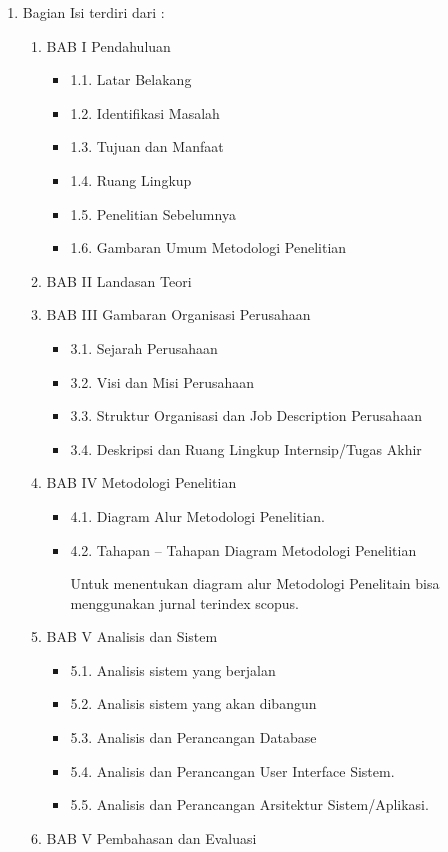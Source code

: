 \begin{enumerate}
\begin{enumerate}
\end{enumerate}
\item
Bagian Isi terdiri dari :
\begin{enumerate}
\item BAB I Pendahuluan
\begin{itemize}
\item 1.1.	Latar Belakang 
\item 1.2.	Identifikasi Masalah 
\item 1.3.	Tujuan dan Manfaat 
\item 1.4.	Ruang Lingkup 
\item 1.5.	Penelitian Sebelumnya
\item 1.6.	Gambaran Umum Metodologi Penelitian 
\end{itemize}
\item BAB II Landasan Teori
\item BAB III Gambaran Organisasi Perusahaan
\begin{itemize}
\item 3.1.	Sejarah Perusahaan
\item 3.2.	Visi dan Misi Perusahaan
\item 3.3.	Struktur Organisasi dan Job Description Perusahaan 
\item 3.4.	Deskripsi dan Ruang Lingkup Internsip/Tugas Akhir
\end{itemize}
\item BAB IV Metodologi Penelitian
\begin{itemize}
\item 4.1.	Diagram Alur Metodologi Penelitian.
\item 4.2.  Tahapan – Tahapan Diagram Metodologi Penelitian

Untuk menentukan diagram alur Metodologi Penelitain bisa menggunakan jurnal terindex scopus.
 
\end{itemize}
\item BAB V Analisis dan Sistem
\begin{itemize}
\item 5.1.	Analisis sistem yang berjalan
\item 5.2.	Analisis sistem yang akan dibangun
\item 5.3.	Analisis dan Perancangan Database
\item 5.4.	Analisis dan Perancangan User Interface Sistem. 
\item 5.5.	Analisis dan Perancangan Arsitektur Sistem/Aplikasi.
\end{itemize}
\item BAB V Pembahasan dan Evaluasi



\end{enumerate}
\end{enumerate}
